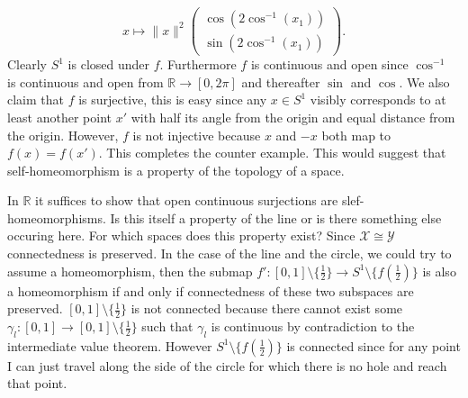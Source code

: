 \documentclass[letter]{article}
\newenvironment{menumerate}{%
  \edef\backupindent{\the\parindent}%
  \enumerate%
  \setlength{\parindent}{\backupindent}%
}{\endenumerate}
\begin{document}
\begin{menumerate}
\begin{menumerate}
		 		 \begin{equation*}
		 		 	x \mapsto \|x\|^2\left(
		 		 	\begin{array}{c}
		 		 		\cos(2\cos^{-1}(x_1)) \\
		 		 		\sin(2\cos^{-1}(x_1))
		 		 	\end{array}\right).
	 		 	\end{equation*}
	 		 	Clearly $S^1$ is closed under $f$. Furthermore $f$ is continuous and open since $\cos^{-1}$ is continuous and open from $\mathbb{R} \to [0,2\pi]$ and thereafter $\sin$ and $\cos.$ We also claim that $f$ is surjective, this is easy since any $x \in S^1$ visibly corresponds to at least another point $x'$ with half its angle from the origin and equal distance from the origin. However, $f$ is not injective because $x$ and $-x$ both map to $f(x)=f(x')$. This completes the counter example.
	 		 	This would suggest that self-homeomorphism is a property of the topology of a space.

	 		 	 In $\mathbb{R}$ it suffices to show that open continuous surjections are slef-homeomorphisms. Is this itself a property of the line or is there something else occuring here. For which spaces does this property exist? Since $\mathcal{X} \cong \mathcal{Y}$ connectedness is preserved. In the case of the line and the circle, we could try to assume a homeomorphism, then the submap $f':[0,1] \setminus \{\frac{1}{2}\} \to S^1 \setminus \{f(\frac{1}{2})\}$ is also a homeomorphism if and only if connectedness of these two subspaces are preserved. $[0,1] \setminus \{\frac12\}$ is not connected because there cannot exist some $\gamma_l :[0,1] \to [0,1] \setminus \{\frac12\}$ such that $\gamma_l$ is continuous by contradiction to the intermediate value theorem. However $S^1 \setminus \{f(\frac12)\}$ is connected since for any point I can just travel along the side of the circle for which there is no hole and reach that point.
		 	\end{menumerate}
 	\end{menumerate}
\end{document}
